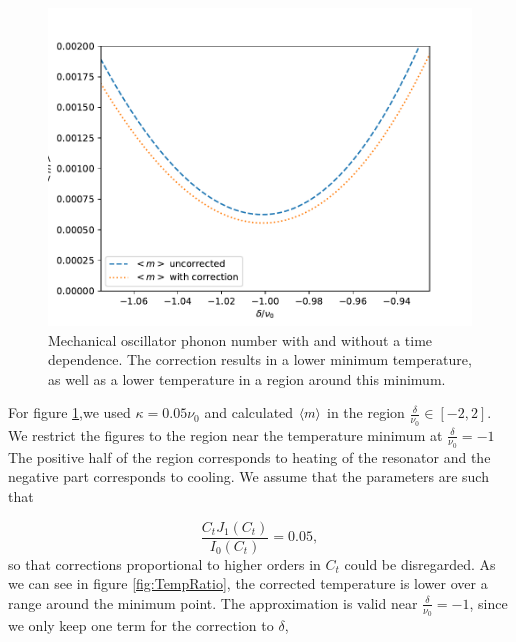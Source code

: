 \documentclass[reprint, amsmath,amssymb, aps,pra]{revtex4-1}
\begin{document}
\begin{figure}[h!]
\includegraphics[scale=.5]{TempGorden1.pdf}   
\caption{ Mechanical oscillator phonon number with and without a time dependence. The correction results in a lower minimum temperature, as well as a lower temperature in a region around this minimum.}\label{fig:TempComparisson}
\end{figure}

For figure \ref{fig:TempComparisson},we used $\kappa = 0.05\nu_0$ and calculated $\expval{m}$ in the region $\frac{\delta}{\nu_0}\in [-2,2]$. We restrict the figures to the region near the temperature minimum at $\frac{\delta}{\nu_0}=-1$ The positive half of the region corresponds to heating of the resonator and the negative part corresponds to cooling. We assume that the parameters are such that

\begin{equation}
\frac{C_tJ_1(C_t)}{I_0(C_t)} = 0.05,
\end{equation}
so that corrections proportional to higher orders in $C_t$ could be
disregarded. As we can see in figure \ref{fig:TempRatio}, the
corrected temperature is lower over a range around the minimum point.
 The approximation is valid near
$\frac{\delta}{\nu_0} = -1$, since we only keep one term for the
correction to $\delta$, 
\end{document}
